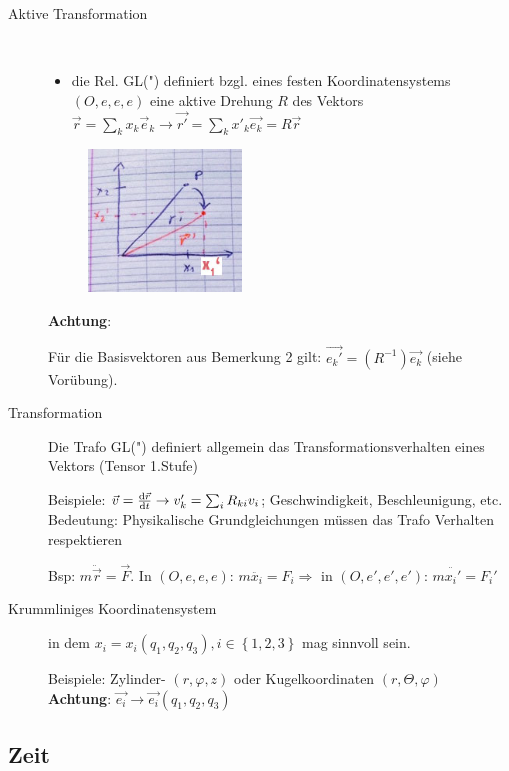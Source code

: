 \begin{description}
\item[Aktive Transformation]~\par
\begin{itemize}
\item die Rel. GL(") definiert bzgl. eines festen Koordinatensystems
  $(O,e,e,e)$ eine aktive Drehung $R$ des Vektors
  $\vec{r}=\sum_k x_k\vec{e}_k \rightarrow \vec{r'}=\sum_k
  x'_k\vec{e_k}=R\vec{r}$
\end{itemize}
\begin{figure}[h]
\begin{center}
\includegraphics[width=0.4\textwidth]{Skizzen/Anhang11.jpg}
\end{center}
\caption{}
\end{figure}
\textbf{Achtung}:

Für die Basisvektoren aus Bemerkung 2 gilt: $\vec{e_k'}=(R^{-1})\vec{e_k}$ (siehe Vorübung).
\item[Transformation] Die Trafo GL(") definiert allgemein das Transformationsverhalten eines Vektors (Tensor 1.Stufe)

Beispiele:
$\vec{v}=\frac{\text{d} \vec{r}}{\text{d} t} \rightarrow v_k'=\sum_iR_{ki}v_i$; Geschwindigkeit, Beschleunigung, etc.\\
Bedeutung: Physikalische Grundgleichungen müssen das Trafo Verhalten respektieren

Bsp: $m\ddot{\vec{r}}=\vec{F}$. In $(O,e,e,e)$: $m\ddot{x_i}=F_i \Rightarrow$ in $(O,e',e',e')$: $m\ddot{x_i'}=F_i'$
\item[Krummliniges Koordinatensystem] in dem $x_i=x_i(q_1,q_2,q_3),i \in \left\{ 1,2,3 \right\}$ mag sinnvoll sein.

Beispiele: Zylinder- $(r, \varphi, z)$ oder Kugelkoordinaten $(r, \Theta, \varphi)$\\
\textbf{Achtung}: $\vec{e_i}\rightarrow\vec{e_i}(q_1,q_2,q_3)$
\end{description}

\subsection{Zeit}
